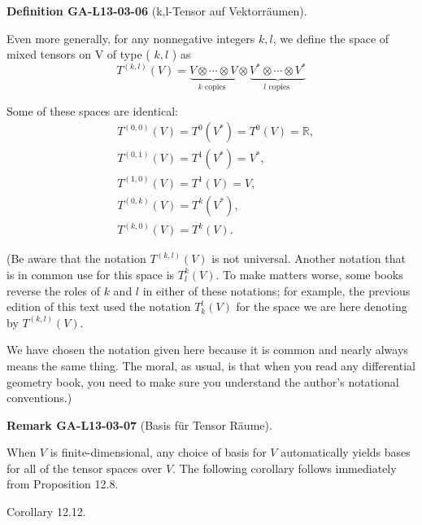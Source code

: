 \documentclass[10pt, letterpaper]{article}
\newcommand{\CustomHeading}[3]{%
  \par\medskip\noindent%
  \textbf{#1 #2} \textnormal{(#3)}.\enskip%
}
\newenvironment{DEF}[2]{\begin{unitbox}\CustomHeading{Definition}{#1}{#2}}{\end{unitbox}}
\newenvironment{REM}[2]{\begin{unitbox}\CustomHeading{Remark}{#1}{#2}}{\end{unitbox}}
\begin{document}
\begin{DEF}{GA-L13-03-06}{k,l-Tensor auf Vektorräumen}
Even more generally, for any nonnegative integers $k, l$, we define the space of mixed tensors on V of type ( $k, l$ ) as
$$
T^{(k, l)}(V)=\underbrace{V \otimes \cdots \otimes V}_{k \text { copies }} \otimes \underbrace{V^{*} \otimes \cdots \otimes V^{*}}_{l \text { copies }}
$$

Some of these spaces are identical:
$$
\begin{aligned}
& T^{(0,0)}(V)=T^{0}\left(V^{*}\right)=T^{0}(V)=\mathbb{R}, \\
& T^{(0,1)}(V)=T^{1}\left(V^{*}\right)=V^{*}, \\
& T^{(1,0)}(V)=T^{1}(V)=V, \\
& T^{(0, k)}(V)=T^{k}\left(V^{*}\right), \\
& T^{(k, 0)}(V)=T^{k}(V) .
\end{aligned}
$$
\end{DEF}

(Be aware that the notation $T^{(k, l)}(V)$ is not universal. Another notation that is in common use for this space is $T_{l}^{k}(V)$. To make matters worse, some books reverse the roles of $k$ and $l$ in either of these notations; for example, the previous edition of this text used the notation $T_{k}^{l}(V)$ for the space we are here denoting by $T^{(k, l)}(V)$.

We have chosen the notation given here because it is common and nearly always means the same thing. The moral, as usual, is that when you read any differential geometry book, you need to make sure you understand the author's notational conventions.)

\begin{REM}{GA-L13-03-07}{Basis für Tensor Räume}
When $V$ is finite-dimensional, any choice of basis for $V$ automatically yields bases for all of the tensor spaces over $V$. The following corollary follows immediately from Proposition 12.8.
\end{REM}


Corollary 12.12. 
\end{document}
